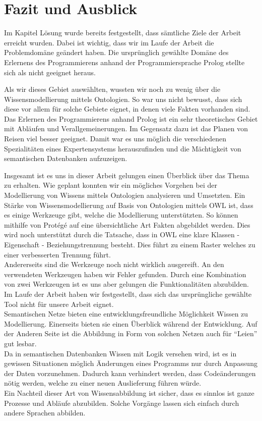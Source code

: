 \chapter{Fazit und Ausblick}
\label{chap:fazit}


Im Kapitel Lösung wurde bereits festgestellt, dass sämtliche Ziele der Arbeit erreicht wurden. Dabei ist wichtig, dass wir im Laufe der Arbeit die Problemdomäne geändert haben. Die ursprünglich gewählte Domäne des Erlernens des Programmierens anhand der Programmiersprache Prolog stellte sich als nicht geeignet heraus.

Als wir dieses Gebiet auswählten, wussten wir noch zu wenig über die Wissensmodellierung mittels Ontologien. So war uns nicht bewusst, dass sich diese vor allem für solche Gebiete eignet, in denen viele Fakten vorhanden sind. Das Erlernen des Programmierens anhand Prolog ist ein sehr theoretisches Gebiet mit Abläufen und Verallgemeinerungen. Im Gegensatz dazu ist das Planen von Reisen viel besser geeignet. Damit war es uns möglich die verschiedenen Spezialitäten eines Expertensystems herauszufinden und die Mächtigkeit von semantischen Datenbanken aufzuzeigen.

Insgesamt ist es uns in dieser Arbeit gelungen einen Überblick über das Thema zu erhalten. Wie geplant konnten wir ein mögliches Vorgehen bei der Modellierung von Wissens mittels Ontologien analysieren und Umsetzten. Ein Stärke von Wissensmodellierung auf Basis von Ontologien mittels OWL ist, dass es einige Werkzeuge gibt, welche die Modellierung unterstützten. So können mithilfe von Protégé auf eine übersichtliche Art Fakten abgebildet werden. Dies wird noch unterstützt durch die Tatsache, dass in OWL eine klare Klassen - Eigenschaft - Beziehungstrennung besteht. Dies führt zu einem Raster welches zu einer verbesserten Trennung führt.\\
Andererseits sind die Werkzeuge noch nicht wirklich ausgereift. An den verwendeten Werkzeugen haben wir Fehler gefunden. Durch eine Kombination von zwei Werkzeugen ist es uns aber gelungen die Funktionalitäten abzubilden. Im Laufe der Arbeit haben wir festgestellt, dass sich das ursprüngliche gewählte Tool nicht für unsere Arbeit eignet.\\
Semantischen Netze bieten eine entwicklungsfreundliche Möglichkeit Wissen zu Modellierung. Einerseits bieten sie einen Überblick während der Entwicklung. Auf der Anderen Seite ist die Abbildung in Form von solchen Netzen auch für "`Leien"' gut lesbar.\\
Da in semantischen Datenbanken Wissen mit Logik versehen wird, ist es in gewissen Situationen möglich Änderungen eines Programms nur durch Anpassung der Daten vorzunehmen. Dadurch kann verhindert werden, dass Codeänderungen nötig werden, welche zu einer neuen Auslieferung führen würde. \\
Ein Nachteil dieser Art von Wissensabbildung ist sicher, dass es sinnlos ist ganze Prozesse und Abläufe abzubilden. Solche Vorgänge lassen sich einfach durch andere Sprachen abbilden. 

